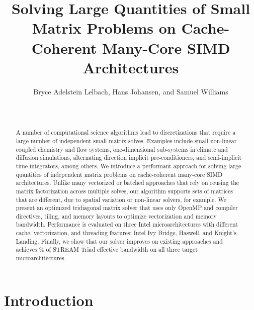 \documentclass{sig-alternate}
\newcommand{\textapprox}{\texttildelow}
\begin{document}
\title{Solving Large Quantities of Small Matrix Problems on Cache-Coherent Many-Core SIMD Architectures}

\author{
\alignauthor
Bryce Adelstein Lelbach, Hans Johansen, and Samuel Williams\\
\\
\\
}

\maketitle

\begin{abstract}
A number of computational science algorithms lead to discretizations
  that require a large number of independent small matrix solves.
Examples include small non-linear coupled chemistry and flow systems,
  one-dimensional sub-systems in climate and diffusion simulations, 
  alternating direction implicit pre-conditioners, and 
  semi-implicit time integrators, among others.
We introduce a performant approach for solving large quantities of 
  independent matrix problems on cache-coherent many-core SIMD architectures.
Unlike many vectorized or batched approaches that rely on reusing
  the matrix factorization across multiple solves, our algorithm supports
  sets of matrices that are different, due to
  spatial variation or non-linear solvers, for example.
We present an optimized tridiagonal matrix solver that uses only OpenMP and
  compiler directives, tiling, and memory layouts to optimize vectorization and
  memory bandwidth.
Performance is evaluated on three Intel microarchitectures with different
  cache, vectorization, and threading features: Intel Ivy Bridge, Haswell, and
  Knight's Landing.
Finally, we show that our solver improves on existing approaches and achieves
  \textapprox 90\% of STREAM Triad effective bandwidth on all three target
  microarchitectures.
\end{abstract}

\section{Introduction}
\label{sec:intro}
\end{document}
